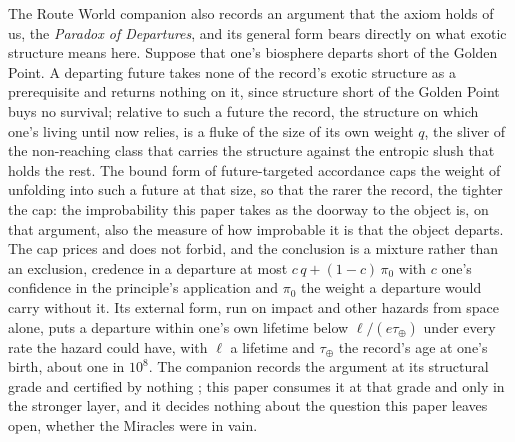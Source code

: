 The Route World companion also records an argument that the axiom
holds of us, the \emph{Paradox of Departures}, and its general form bears
directly on what exotic structure means here. Suppose that one's biosphere
departs short of the Golden Point. A departing future takes none of the
record's exotic structure as a prerequisite and returns nothing on it,
since structure short of the Golden Point buys no survival; relative to
such a future the record, the structure on which one's living until now
relies, is a fluke of the size of its own weight $q$, the sliver of the
non-reaching class that carries the structure against the entropic slush
that holds the rest. The bound form of future-targeted accordance caps the
weight of unfolding into such a future at that size, so that the rarer the
record, the tighter the cap: the improbability this paper takes as the
doorway to the object is, on that argument, also the measure of how
improbable it is that the object departs. The cap prices and does not
forbid, and the conclusion is a mixture rather than an exclusion, credence
in a departure at most $c\,q+(1-c)\,\pi_0$ with $c$ one's confidence in the
principle's application and $\pi_0$ the weight a departure would carry
without it. Its external form, run on impact and other hazards from space
alone, puts a departure within one's own lifetime below
$\ell/(e\tau_\oplus)$ under every rate the hazard could have, with $\ell$ a
lifetime and $\tau_\oplus$ the record's age at one's birth, about one in
$10^{8}$. The companion records the argument at its
structural grade and certified by nothing \cite{GoldenRouteWorld,GoldenTargeted};
this paper consumes it at that grade and only in the stronger layer, and it
decides nothing about the question this paper leaves open, whether the
Miracles were in vain.

